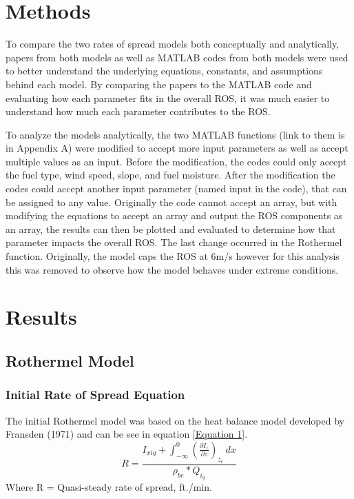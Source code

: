 \documentclass{article}
\begin{document}
\section{Methods}
To compare the two rates of spread models both conceptually and analytically, papers from both models as well as MATLAB codes from both models were used to better understand the underlying equations, constants, and assumptions behind each model. By comparing the papers to the MATLAB code and evaluating how each parameter fits in the overall ROS, it was much easier to understand how much each parameter contributes to the ROS. 


To analyze the models analytically, the two MATLAB functions (link to them is in Appendix A) were modified to accept more input parameters as well as accept multiple values as an input. Before the modification, the codes could only accept the fuel type, wind speed, slope, and fuel moisture. After the modification the codes could accept another input parameter (named input in the code), that can be assigned to any value. Originally the code cannot accept an array, but with modifying the equations to accept an array and output the ROS components as an array, the results can then be plotted and evaluated to determine how that parameter impacts the overall ROS. The last change occurred in the Rothermel function. Originally, the model caps the ROS at 6m/s however for this analysis this was removed to observe how the model behaves under extreme conditions. 

\section{Results}
\subsection{Rothermel Model}
\subsubsection{Initial Rate of Spread Equation}

The initial Rothermel model was based on the heat balance model developed by Fransden (1971) and can be see in equation \ref{Equation 1}. 
\begin{equation}
R = \frac {I_{xig} + \int_{-\infty}^{0} (\frac {\partial I_{z}} {\partial z})_{z_c}\,dx }{\rho_{be} * Q_{i_g}}
\label{Equation 1}
\end{equation}
Where R = Quasi-steady rate of spread, ft./min. \\
\end{document}
